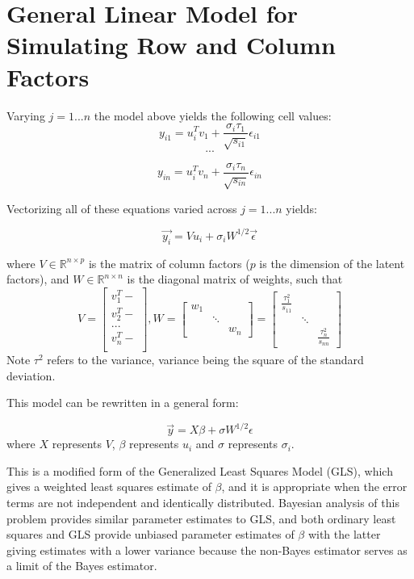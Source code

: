 \documentclass[12pt,twoside]{dukestatscithesis}
\theoremstyle{definition}
\theoremstyle{definition}
\theoremstyle{definition}
\theoremstyle{remark}
\begin{document}
\section{General Linear Model for Simulating Row and Column
Factors}\label{general-linear-model-for-simulating-row-and-column-factors}

Varying \(j = 1 ... n\) the model above yields the following cell
values:
\[y_{i1} = u_i^Tv_1 + \frac{\sigma_i \tau_1}{\sqrt{s_{i1}}}\epsilon_{i1}\]
\[ ... \]

\[ y_{in} = u_i^Tv_n + \frac{\sigma_i \tau_n}{\sqrt{s_{in}}}\epsilon_{in} \]

Vectorizing all of these equations varied across \(j = 1...n\) yields:

\[\vec{y_i} = Vu_i + \sigma_i W^{1/2}\vec{\epsilon}\]

where \(V \in \mathbb{R}^{n \times p}\) is the matrix of column factors
(\(p\) is the dimension of the latent factors), and
\(W \in \mathbb{R}^{n \times n}\) is the diagonal matrix of weights,
such that \[V =
  \begin{bmatrix}
    v_1^T- \\
    v_2^T- \\
    ... \\
    v_n^T- \\
  \end{bmatrix},
  W =
  \begin{bmatrix}
    w_{1} & & \\
    & \ddots & \\
    & & w_{n}
  \end{bmatrix} 
  = \begin{bmatrix}
    \frac{\tau_1^2}{s_{11}} & & \\
    & \ddots & \\
    & & \frac{\tau_n^2}{s_{nn}}
  \end{bmatrix}\]
Note \(\tau^2\) refers to the variance, variance being the square of the
standard deviation.

This model can be rewritten in a general form:

\[\vec{y} = X\beta + \sigma W^{1/2}\epsilon\] where \(X\) represents
\(V\), \(\beta\) represents \(u_i\) and \(\sigma\) represents
\(\sigma_i\).

This is a modified form of the Generalized Least Squares Model (GLS),
which gives a weighted least squares estimate of \(\beta\), and it is
appropriate when the error terms are not independent and identically
distributed. Bayesian analysis of this problem provides similar
parameter estimates to GLS, and both ordinary least squares and GLS
provide unbiased parameter estimates of \(\beta\) with the latter giving
estimates with a lower variance because the non-Bayes estimator serves
as a limit of the Bayes estimator.
\end{document}
